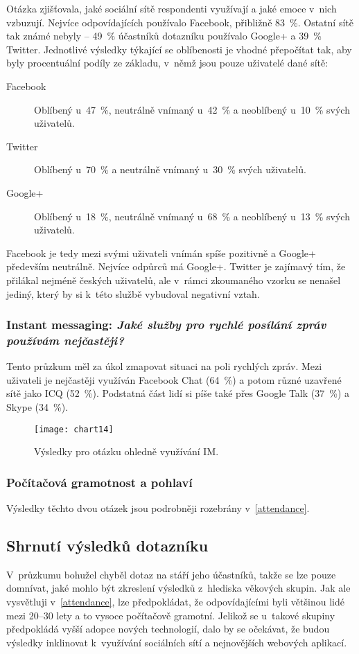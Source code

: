 \documentclass[12pt,oneside,final]{fithesis2}
\begin{document}
Otázka zjišťovala, jaké sociální sítě respondenti využívají a jaké emoce v~nich vzbuzují. Nejvíce odpovídajících používalo Facebook, přibližně 83~\%. Ostatní sítě tak známé nebyly -- 49~\% účastníků dotazníku používalo Google+ a 39~\% Twitter. Jednotlivé výsledky týkající se oblíbenosti je vhodné přepočítat tak, aby byly procentuální podíly ze základu, v~němž jsou pouze uživatelé dané sítě:

\begin{description}
    \item[Facebook] Oblíbený u~47~\%, neutrálně vnímaný u~42~\% a neoblíbený u~10~\% svých uživatelů.
    \item[Twitter] Oblíbený u~70~\% a neutrálně vnímaný u~30~\% svých uživatelů.
    \item[Google+] Oblíbený u~18~\%, neutrálně vnímaný u~68~\% a neoblíbený u~13~\% svých uživatelů.
\end{description}

Facebook je tedy mezi svými uživateli vnímán spíše pozitivně a Google+ především neutrálně. Nejvíce odpůrců má Google+. Twitter je zajímavý tím, že přilákal nejméně českých uživatelů, ale v~rámci zkoumaného vzorku se nenašel jediný, který by si k~této službě vybudoval negativní vztah.

\subsubsection*{\textbf{Instant messaging:} \emph{Jaké služby pro rychlé posílání zpráv používám nejčastěji?}}
Tento průzkum měl za úkol zmapovat situaci na poli rychlých zpráv. Mezi uživateli je nejčastěji využíván Facebook Chat (64~\%) a potom různé uzavřené sítě jako ICQ (52~\%). Podstatná část lidí si píše také přes Google Talk (37~\%) a Skype (34~\%).

\begin{figure}[H]
    \centering
    \texttt{[image: chart14]}
    \caption{Výsledky pro otázku ohledně využívání IM.}
\end{figure}

\subsubsection*{\textbf{Počítačová gramotnost a pohlaví}}
Výsledky těchto dvou otázek jsou podrobněji rozebrány v~\ref{attendance}.

\subsection{Shrnutí výsledků dotazníku}\label{pollResults}
V~průzkumu bohužel chyběl dotaz na stáří jeho účastníků, takže se lze pouze domnívat, jaké mohlo být zkreslení výsledků z~hlediska věkových skupin. Jak ale vysvětluji v~\ref{attendance}, lze předpokládat, že odpovídajícími byli většinou lidé mezi 20--30 lety a to vysoce počítačově gramotní. Jelikož se u~takové skupiny předpokládá vyšší adopce nových technologií, dalo by se očekávat, že budou výsledky inklinovat k~využívání sociálních sítí a nejnovějších webových aplikací.
\end{document}
